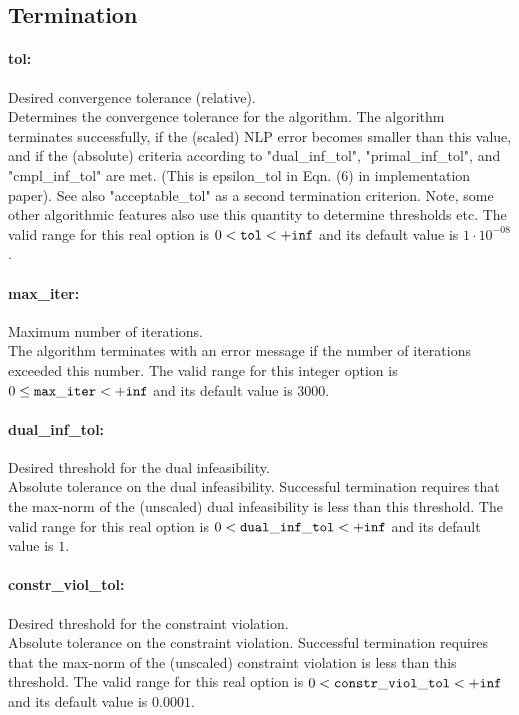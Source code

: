 \subsection{Termination}

\paragraph{tol:}\label{sec:tol} Desired convergence tolerance (relative). $\;$ \\
 Determines the convergence tolerance for the
algorithm.  The algorithm terminates
successfully, if the (scaled) NLP error becomes
smaller than this value, and if the (absolute)
criteria according to "dual\_inf\_tol",
"primal\_inf\_tol", and "cmpl\_inf\_tol" are met.
 (This is epsilon\_tol in Eqn. (6) in
implementation paper).  See also
"acceptable\_tol" as a second termination
criterion.  Note, some other algorithmic features
also use this quantity to determine thresholds
etc. The valid range for this real option is 
$0 <  {\tt tol } <  {\tt +inf}$
and its default value is $1 \cdot 10^{-08}$.


\paragraph{max\_iter:}\label{sec:max_iter} Maximum number of iterations. $\;$ \\
 The algorithm terminates with an error message if
the number of iterations exceeded this number. The valid range for this integer option is
$0 \le {\tt max\_iter } <  {\tt +inf}$
and its default value is $3000$.


\paragraph{dual\_inf\_tol:}\label{sec:dual_inf_tol} Desired threshold for the dual infeasibility. $\;$ \\
 Absolute tolerance on the dual infeasibility.
Successful termination requires that the max-norm
of the (unscaled) dual infeasibility is less than
this threshold. The valid range for this real option is 
$0 <  {\tt dual\_inf\_tol } <  {\tt +inf}$
and its default value is $1$.


\paragraph{constr\_viol\_tol:}\label{sec:constr_viol_tol} Desired threshold for the constraint violation. $\;$ \\
 Absolute tolerance on the constraint violation.
Successful termination requires that the max-norm
of the (unscaled) constraint violation is less
than this threshold. The valid range for this real option is 
$0 <  {\tt constr\_viol\_tol } <  {\tt +inf}$
and its default value is $0.0001$.


